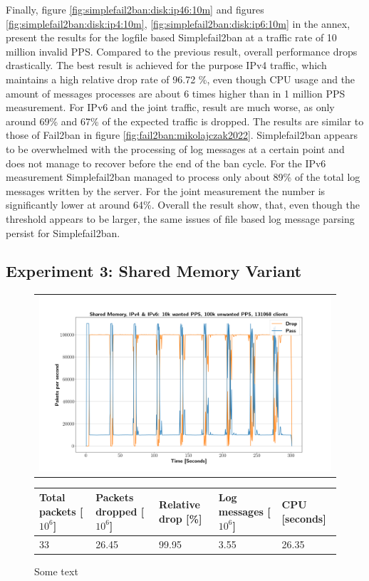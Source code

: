 Finally, figure \ref{fig:simplefail2ban:disk:ip46:10m} and figures \ref{fig:simplefail2ban:disk:ip4:10m}, \ref{fig:simplefail2ban:disk:ip6:10m} in the annex, present the results
for the logfile based Simplefail2ban at a traffic rate of 10 million invalid \ac{PPS}. Compared to the previous result, overall performance drops drastically. The best result is achieved for the purpose
\ac{IPv4} traffic, which maintains a high relative drop rate of 96.72 \%, even though CPU usage and the amount of messages processes are about 6 times 
higher than in 1 million \ac{PPS} measurement. For \ac{IPv6} and the joint traffic, result are much worse, as only around 69\% and 67\% of the expected traffic is dropped.
The results are similar to those of Fail2ban in figure \ref{fig:fail2ban:mikolajczak2022}. Simplefail2ban appears to be overwhelmed with the processing of log messages at a certain point and
does not manage to recover before the end of the ban cycle. For the \ac{IPv6} measurement Simplefail2ban managed to process only about 89\% of the total log messages written by the server. For the joint measurement
the number is significantly lower at around 64\%. Overall the result show, that, even though the threshold appears to be larger, the same issues of file based log message parsing persist for Simplefail2ban.



\subsection{Experiment 3: Shared Memory Variant}


\begin{figure}[!h]
	\label{fig:simplefail2ban:shm:ip46:100k}
	\centering
	\scriptsize
	\begin{tabular}{c}
    	\centerline{\includegraphics[width=1.2\textwidth]{images/simplefail2ban_shm_ipv46_v10k_iv100k_c131068.png}}
	\end{tabular}
	\begin{tabular}{lllll}
		\toprule
		\textbf{Total packets [$10^6$]} & \textbf{Packets dropped [$10^6$]} & \textbf{Relative drop [\%]} & \textbf{Log messages [$10^6$]} & \textbf{CPU [seconds]} \\ \midrule 
		33 & 26.45 & 99.95 & 3.55 & 26.35 \\
		\bottomrule
	\end{tabular}
	\caption[Simplefail2ban, Shared Memory, IPv4 \& IPv6, 100k \ac{PPS}]{Some text}
\end{figure}

